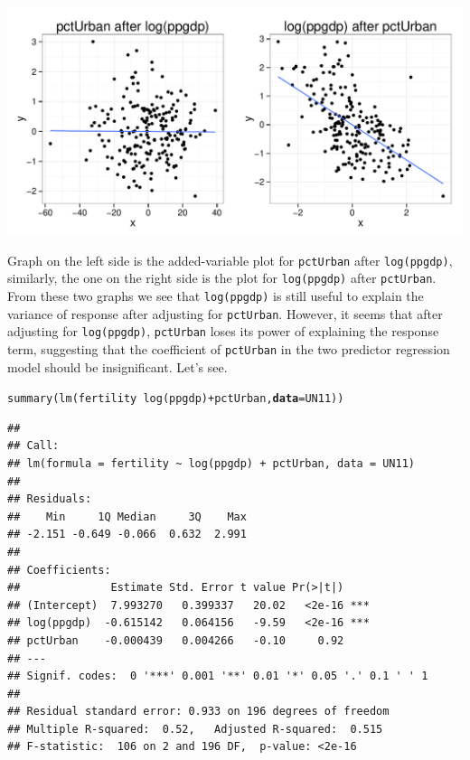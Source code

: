 \documentclass[12pt,oneside,a4paper]{article}\usepackage[]{graphicx}\usepackage[]{xcolor}
\makeatletter
\newcommand{\hlopt}[1]{\textcolor[rgb]{0,0,0}{#1}}%
\newcommand{\hlstd}[1]{\textcolor[rgb]{0,0,0}{#1}}%
\newcommand{\hlkwc}[1]{\textcolor[rgb]{0.498,0,0.333}{\textbf{#1}}}%
\newcommand{\hlkwd}[1]{\textcolor[rgb]{0,0,0}{#1}}%
\newenvironment{kframe}{%
 \def\at@end@of@kframe{}%
 \ifinner\ifhmode%
  \def\at@end@of@kframe{\end{minipage}}%
  \begin{minipage}{\columnwidth}%
 \fi\fi%
 \def\FrameCommand##1{\hskip\@totalleftmargin \hskip-\fboxsep
 \colorbox{shadecolor}{##1}\hskip-\fboxsep
     \hskip-\linewidth \hskip-\@totalleftmargin \hskip\columnwidth}%
 \MakeFramed {\advance\hsize-\width
   \@totalleftmargin\z@ \linewidth\hsize
   \@setminipage}}%
 {\par\unskip\endMakeFramed%
 \at@end@of@kframe}
\newenvironment{knitrout}{}{} %
\newcommand{\m}[1]{\texttt{{#1}}}
\makeatother
\begin{document}
\begin{knitrout}
{\centering \includegraphics[width=.9\linewidth]{figure/p323} 

}



\end{knitrout}

Graph on the left side is the added-variable plot for \m{pctUrban} after \m{log(ppgdp)}, similarly, the one on the right side is the plot for \m{log(ppgdp)} after \m{pctUrban}. From these two graphs we see that \m{log(ppgdp)} is still useful to explain the variance of response after adjusting for \m{pctUrban}. However, it seems that after adjusting for \m{log(ppgdp)}, \m{pctUrban} loses its power of explaining the response term, suggesting that the coefficient of \m{pctUrban} in the two predictor regression model should be insignificant. Let's see.

\begin{knitrout}
\color{fgcolor}\begin{kframe}
\begin{alltt}
\hlkwd{summary}\hlstd{(}\hlkwd{lm}\hlstd{(fertility} \hlopt{~} \hlkwd{log}\hlstd{(ppgdp)} \hlopt{+} \hlstd{pctUrban,} \hlkwc{data} \hlstd{= UN11))}
\end{alltt}
\begin{verbatim}
## 
## Call:
## lm(formula = fertility ~ log(ppgdp) + pctUrban, data = UN11)
## 
## Residuals:
##    Min     1Q Median     3Q    Max 
## -2.151 -0.649 -0.066  0.632  2.991 
## 
## Coefficients:
##              Estimate Std. Error t value Pr(>|t|)    
## (Intercept)  7.993270   0.399337   20.02   <2e-16 ***
## log(ppgdp)  -0.615142   0.064156   -9.59   <2e-16 ***
## pctUrban    -0.000439   0.004266   -0.10     0.92    
## ---
## Signif. codes:  0 '***' 0.001 '**' 0.01 '*' 0.05 '.' 0.1 ' ' 1
## 
## Residual standard error: 0.933 on 196 degrees of freedom
## Multiple R-squared:  0.52,	Adjusted R-squared:  0.515 
## F-statistic:  106 on 2 and 196 DF,  p-value: <2e-16
\end{verbatim}
\end{kframe}
\end{knitrout}
\end{document}
